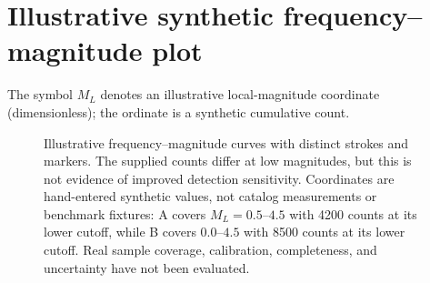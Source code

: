 \documentclass{article}
\begin{document}
\section*{Illustrative synthetic frequency--magnitude plot}

The symbol $M_L$ denotes an illustrative local-magnitude coordinate
(dimensionless); the ordinate is a synthetic cumulative count.

\begin{figure}[htbp]
  \centering
  \caption{Illustrative frequency--magnitude curves with distinct strokes
    and markers. The supplied counts differ at low magnitudes, but this
    is not evidence of improved detection sensitivity. Coordinates are
    hand-entered synthetic values, not catalog measurements or benchmark
    fixtures: A covers $M_L=0.5$--$4.5$ with 4200 counts at its lower cutoff,
    while B covers $0.0$--$4.5$ with 8500 counts at its lower cutoff.
    Real sample coverage, calibration, completeness, and uncertainty
    have not been evaluated.}
  \label{fig:synthetic-frequency-magnitude}
\end{figure}
\end{document}
